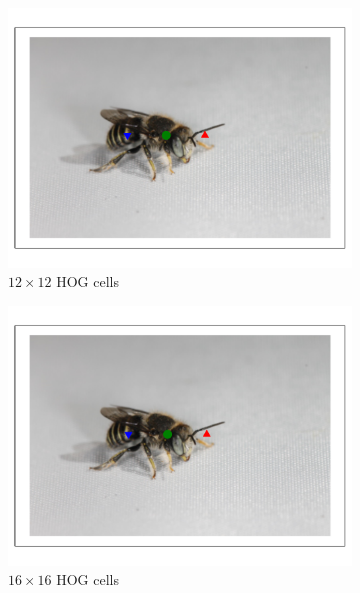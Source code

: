 \documentclass[11pt, oneside]{report}
\begin{document}
\begin{figure}[p]
\begin{subfigure}[b]{0.3\textwidth}
                \includegraphics[width=\textwidth]{hog12_1.pdf}
                \caption{$12\times12$ HOG cells}
            \end{subfigure}
            \begin{subfigure}[b]{0.3\textwidth}
                \centering
                \includegraphics[width=\textwidth]{hog16_1.pdf}
                \caption{$16\times16$ HOG cells}
            \end{subfigure}
            \begin{subfigure}[b]{0.3\textwidth}
                \centering

\end{subfigure}
\end{figure}
\end{document}
